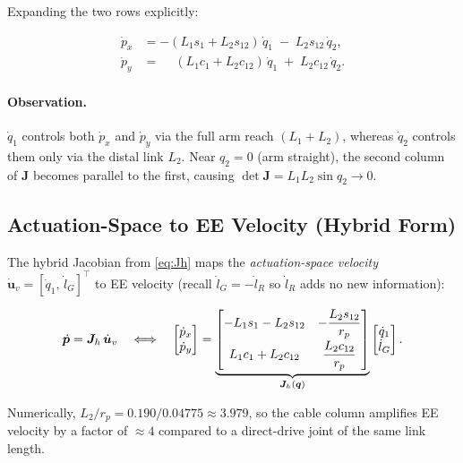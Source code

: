 \documentclass[12pt, a4paper]{article}
\theoremstyle{definition}
\newcommand{\bq}{\bm{q}}
\newcommand{\bp}{\bm{p}}
\newcommand{\bu}{\bm{u}}
\newcommand{\bJ}{\bm{J}}
\begin{document}
\noindent
Expanding the two rows explicitly:

\begin{align}
  \dot{p}_x &= -(L_1 s_1 + L_2 s_{12})\,\dot{q}_1 \;-\; L_2 s_{12}\,\dot{q}_2 ,
  \label{eq:px_dot}\\
  \dot{p}_y &= \phantom{-}(L_1 c_1 + L_2 c_{12})\,\dot{q}_1 \;+\; L_2 c_{12}\,\dot{q}_2 .
  \label{eq:py_dot}
\end{align}

\paragraph{Observation.}
$\dot{q}_1$ controls both $\dot{p}_x$ and $\dot{p}_y$ via the full arm reach
$(L_1 + L_2)$, whereas $\dot{q}_2$ controls them only via the distal link $L_2$.
Near $q_2 = 0$ (arm straight), the second column of $\bJ$ becomes parallel to
the first, causing $\det\bJ = L_1 L_2 \sin q_2 \to 0$.

\subsection{Actuation-Space to EE Velocity (Hybrid Form)}
\label{sec:actspc2ee}

The hybrid Jacobian from \cref{eq:Jh} maps the \emph{actuation-space velocity}
$\dot{\bu}_v = [\dot{q}_1,\,\dot{l}_G]^\top$ to EE velocity
(recall $\dot{l}_G = -\dot{l}_R$ so $\dot{l}_R$ adds no new information):

\begin{equation}
  \label{eq:hybrid_vel_exp}
  \dot{\bp} = \bJ_h\,\dot{\bu}_v
  \quad\Longleftrightarrow\quad
  \begin{bmatrix} \dot{p}_x \\ \dot{p}_y \end{bmatrix}
  =
  \underbrace{%
  \begin{bmatrix}
    -L_1 s_1 - L_2 s_{12} & -\dfrac{L_2 s_{12}}{r_p} \\[8pt]
     L_1 c_1 + L_2 c_{12} &  \dfrac{L_2 c_{12}}{r_p}
  \end{bmatrix}
  }_{\bJ_h(\bq)}
  \begin{bmatrix} \dot{q}_1 \\ \dot{l}_G \end{bmatrix}.
\end{equation}

Numerically, $L_2 / r_p = 0.190 / 0.04775 \approx 3.979$, so the cable column
amplifies EE velocity by a factor of $\approx 4$ compared to a direct-drive
joint of the same link length.
\end{document}
